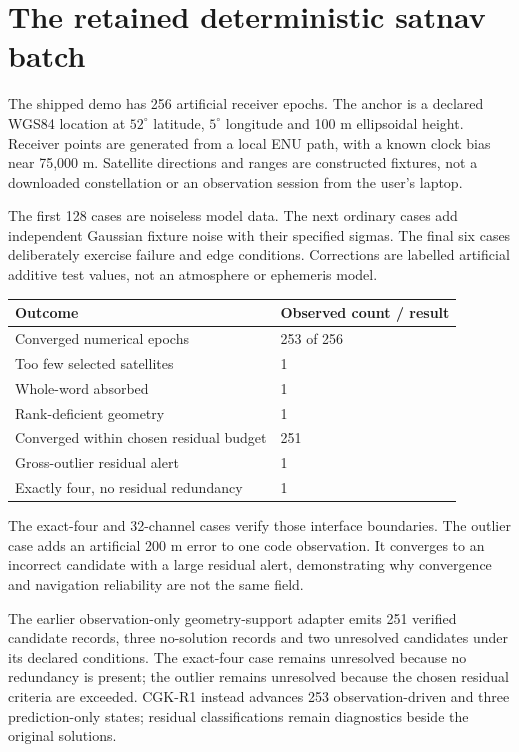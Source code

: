 \documentclass[11pt,a4paper]{article}
\begin{document}
\section{The retained deterministic satnav batch}
The shipped demo has 256 artificial receiver epochs. The anchor is a declared WGS84
location at $52^\circ$ latitude, $5^\circ$ longitude and 100 m ellipsoidal height.
Receiver points are generated from a local ENU path, with a known clock bias near
75,000 m. Satellite directions and ranges are constructed fixtures, not a downloaded
constellation or an observation session from the user's laptop.

The first 128 cases are noiseless model data. The next ordinary cases add independent
Gaussian fixture noise with their specified sigmas. The final six cases deliberately
exercise failure and edge conditions. Corrections are labelled artificial additive
test values, not an atmosphere or ephemeris model.

\begin{center}
\begin{tabularx}{\textwidth}{@{}P{.42\textwidth}Y@{}}\toprule
\textbf{Outcome} & \textbf{Observed count / result}\\\midrule
Converged numerical epochs & 253 of 256\\
Too few selected satellites & 1\\
Whole-word absorbed & 1\\
Rank-deficient geometry & 1\\
Converged within chosen residual budget & 251\\
Gross-outlier residual alert & 1\\
Exactly four, no residual redundancy & 1\\\bottomrule
\end{tabularx}
\end{center}

The exact-four and 32-channel cases verify those interface boundaries. The outlier
case adds an artificial 200 m error to one code observation. It converges to an
incorrect candidate with a large residual alert, demonstrating why convergence and
navigation reliability are not the same field.

The earlier observation-only geometry-support adapter emits 251 verified candidate
records, three no-solution records and two unresolved candidates under its declared
conditions. The exact-four case remains unresolved because no redundancy is present;
the outlier remains unresolved because the chosen residual criteria are exceeded.
CGK-R1 instead advances 253 observation-driven and three prediction-only states;
residual classifications remain diagnostics beside the original solutions.
\end{document}
